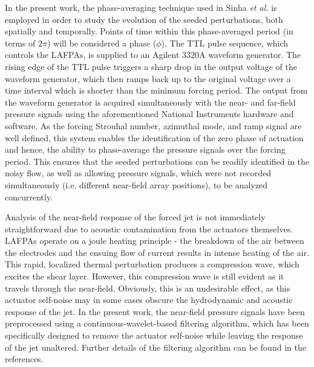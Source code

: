 \documentclass[english]{aiaa-tc}
\begin{document}
In the present work, the phase-averaging technique used in Sinha {\em et al.}\cite{sinha2013} is employed in order to study the evolution of the seeded perturbations, both spatially and temporally. Points of time within this phase-averaged period (in terms of $2\pi$) will be considered a phase ($\phi$). The TTL pulse sequence, which controls the LAFPAs, is supplied to an Agilent 3320A waveform generator. The rising edge of the TTL pulse triggers a sharp drop in the output voltage of the waveform generator, which then ramps back up to the original voltage over a time interval which is shorter than the minimum forcing period. The output from the waveform generator is acquired simultaneously with the near- and far-field pressure signals using the aforementioned National Instruments hardware and software. As the forcing Strouhal number, azimuthal mode, and ramp signal are well defined, this system enables the identification of the zero phase of actuation and hence, the ability to phase-average the pressure signals over the forcing period. This ensures that the seeded perturbations can be readily identified in the noisy flow, as well as allowing pressure signals, which were not recorded simultaneously (i.e. different near-field array positions), to be analyzed concurrently. 

Analysis of the near-field response of the forced jet is not immediately straightforward due to acoustic contamination from the actuators themselves\cite{sinha2013}. LAFPAs operate on a joule heating principle - the breakdown of the air between the electrodes and the ensuing flow of current results in intense heating of the air. This rapid, localized thermal perturbation produces a compression wave, which excites the shear layer. However, this compression wave is still evident as it travels through the near-field. Obviously, this is an undesirable effect, as this actuator self-noise may in some cases obscure the hydrodynamic and acoustic response of the jet. In the present work, the near-field pressure signals have been preprocessed using a continuous-wavelet-based filtering algorithm, which has been specifically designed to remove the actuator self-noise while leaving the response of the jet unaltered. Further details of the filtering algorithm can be found in the references\cite{Alkandry2013}. 
\end{document}
